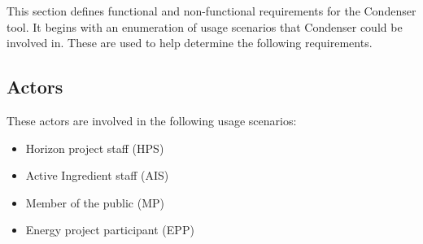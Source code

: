 This section defines functional and non-functional requirements for the Condenser tool. It begins with an enumeration of usage scenarios that Condenser could be involved in. These are used to help determine the following requirements.

\subsection{Actors}
These actors are involved in the following usage scenarios:
		\begin{itemize}
\item Horizon project staff (HPS)
\item Active Ingredient staff (AIS)
\item Member of the public (MP) 
\item Energy	project participant (EPP)
\end{itemize}


